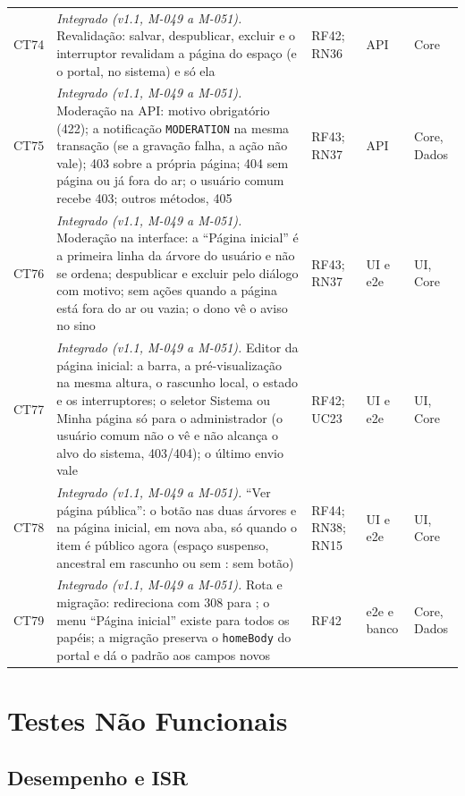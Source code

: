\begin{longtable}{@{}L{1.1cm}L{7.0cm}L{2.2cm}L{1.6cm}L{1.6cm}@{}}
CT74 & \emph{Integrado (v1.1, M-049 a M-051).} Revalidação: salvar, despublicar, excluir e o interruptor revalidam a página do espaço (e o portal, no sistema) e só ela & RF42; RN36 & API & Core\\[2pt]
CT75 & \emph{Integrado (v1.1, M-049 a M-051).} Moderação na API: motivo obrigatório (422); a notificação \texttt{MODERATION} na mesma transação (se a gravação falha, a ação não vale); 403 sobre a própria página; 404 sem página ou já fora do ar; o usuário comum recebe 403; outros métodos, 405 & RF43; RN37 & API & Core, Dados\\[2pt]
CT76 & \emph{Integrado (v1.1, M-049 a M-051).} Moderação na interface: a ``Página inicial'' é a primeira linha da árvore do usuário e não se ordena; despublicar e excluir pelo diálogo com motivo; sem ações quando a página está fora do ar ou vazia; o dono vê o aviso no sino & RF43; RN37 & UI e e2e & UI, Core\\[2pt]
CT77 & \emph{Integrado (v1.1, M-049 a M-051).} Editor da página inicial: a barra, a pré-visualização na mesma altura, o rascunho local, o estado e os interruptores; o seletor Sistema ou Minha página só para o administrador (o usuário comum não o vê e não alcança o alvo do sistema, 403/404); o último envio vale & RF42; UC23 & UI e e2e & UI, Core\\[2pt]
CT78 & \emph{Integrado (v1.1, M-049 a M-051).} ``Ver página pública'': o botão nas duas árvores e na página inicial, em nova aba, só quando o item é público agora (espaço suspenso, ancestral em rascunho ou sem : sem botão) & RF44; RN38; RN15 & UI e e2e & UI, Core\\[2pt]
CT79 & \emph{Integrado (v1.1, M-049 a M-051).} Rota e migração:  redireciona com 308 para ; o menu ``Página inicial'' existe para todos os papéis; a migração preserva o \texttt{homeBody} do portal e dá o padrão aos campos novos & RF42 & e2e e banco & Core, Dados\\[2pt]
\end{longtable}

\section{Testes Não Funcionais}\label{sec:testes-nf}

\subsection{Desempenho e ISR}

